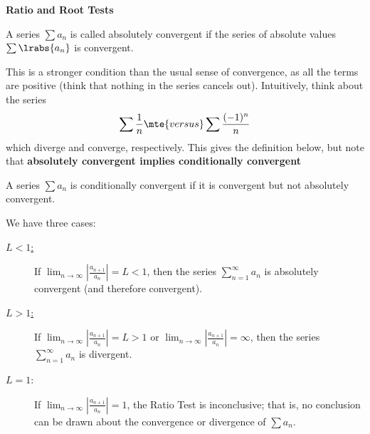 
\chead{\today}
\graphicspath{ {\string~/Desktop} }
\usetikzlibrary{arrows}
\newcommand{\ans}[1]{ \noindent {\color{red} \textbf{Answer:} #1}}

\begin{center}
\textbf{Ratio and Root Tests}
\end{center}

\begin{defi}
A series $\sum a_n$ is called absolutely convergent if the series of absolute values $\sum \lrabs{a_n}$ is convergent. 
\end{defi}
\begin{aun}
This is a stronger condition than the usual sense of convergence, as all the terms are positive (think that nothing in the series cancels out). Intuitively, think about the series 
\[
\sum \frac1n \mte{ versus } \sum \frac{(-1)^n}{n}
\]
which diverge and converge, respectively. This gives the definition below, but note that \textbf{absolutely convergent implies conditionally convergent}
\end{aun}

\begin{defi}
A series $\sum a_n$ is conditionally convergent if it is convergent but not absolutely convergent. 
\end{defi}

\begin{thm} We have three cases:
\begin{description}
\item[\underline{$L < 1$:}] If $\lim _{n \rightarrow \infty}\left|\frac{a_{n+1}}{a_n}\right|=L<1$, then the series $\sum_{n=1}^{\infty} a_n$ is absolutely convergent (and therefore convergent).
\item[\underline{$L > 1$:}] If $\lim _{n \rightarrow \infty}\left|\frac{a_{n+1}}{a_n}\right|=L>1$ or $\lim _{n \rightarrow \infty}\left|\frac{a_{n+1}}{a_n}\right|=\infty$, then the series $\sum_{n=1}^{\infty} a_n$ is divergent.
\item[\underline{$L = 1$}:] If $\lim _{n \rightarrow \infty}\left|\frac{a_{n+1}}{a_n}\right|=1$, the Ratio Test is inconclusive; that is, no conclusion can be drawn about the convergence or divergence of $\sum a_n$.
\end{description}
\end{thm}

